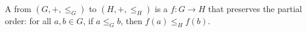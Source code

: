 \begin{definition} \label{definition:homomorphism_of_ordered_abelian_groups}
    A  from $(G,+,\leq_G)$ to $(H,+,\leq_H)$ is a  $f : G \to H$ that preserves the partial order: for all $a,b \in G$, if $a \leq_G b$, then $f(a) \leq_H f(b)$.
\end{definition}